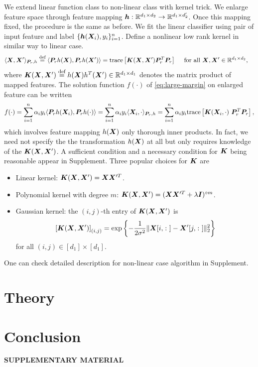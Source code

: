 \documentclass[12pt]{article}
\begin{document}
\label{sec:nonlinear}
We extend linear function class to non-linear class with kernel trick. We enlarge feature space through feature mapping $\bm{h}:\mathbb{R}^{d_1\times d_2}\rightarrow \mathbb{R	}^{d_1\times d_2'}$. Once this mapping fixed, the procedure is the same as before.
We fit the linear classifier using pair of input feature and label $\{\bm{h}(\bm X_i),y_i\}_{i=1}^n$.
Define a nonlinear low rank kernel in similar way to linear case.
\begin{align}\label{eq:nonlinear kernel}
\langle \bm X,\bm X'\rangle_{\bm{P}_r,h} &\stackrel{\text{def}}{=} \langle \bm{P}_r h(\bm X),\bm{P}_r h(\bm X')\rangle = \text{trace}\left[\bm K(\bm X,\bm X')\bm{P}_r^T\bm{P}_r\right]\quad\text{ for all } \bm X,\bm X'\in\mathbb{R}^{d_1\times d_2},
\end{align}
where $\bm K(\bm X,\bm X')\stackrel{\text{def}}{=} h(\bm X)h^T(\bm X')
\in \mathbb{R}^{d_1\times d_1}$ denotes the matrix product of mapped features.
The solution function $ f(\cdot)$ of \eqref{eq:large-margin} on enlarged feature can be written 
\begin{align}
f(\cdot) = \sum_{i=1}^n\alpha _i y_i \langle \bm{P}_r h(\bm X_i), \bm{P}_r h(\cdot)\rangle =  \sum_{i=1}^n  \alpha _i y_i \langle \bm X_i, \cdot\rangle_{ \bm{P}_r,h}  =  \sum_{i=1}^n  \alpha _i y_i \text{trace}\left[\bm K(\bm X_i,\cdot)\ \bm{P}_r^T \bm{P}_r\right],
\end{align}
which involves feature mapping $h(\bm X)$ only thorough inner products. In fact, we need not specify the the transformation $h(\bm X)$ at all but only requires knowledge of the $
\bm K(\bm X,\bm X')$. A sufficient condition and a necessary condition for $\bm K$ being reasonable appear in Supplement.
Three popular choices for $\bm K$ are
\begin{itemize}
\item Linear kernel: $\bm K(\bm X,\bm X')=\bm X\bm X'^T$.
\item Polynomial kernel with degree $m$: $\bm K(\bm X,\bm X')=(\bm X\bm X'^T+\lambda\bm I)^{\circ m}$.
\item Gaussian kernel: the $(i,j)$-th entry of $\bm K(\bm X,\bm X')$ is 
\[
\left[\bm K(\bm X,\bm X')\right]_{(i,j)}=\exp\left\{-{1\over 2\sigma^2} \|\bm X[i,\colon]-\bm X'[j,\colon]\|_2^2\right\}
\]
for all $(i,j)\in[d_1]\times[d_1]$.
\end{itemize}
One can check detailed description for non-linear case algorithm in Supplement.
\section{Theory}
\label{sec:thm}
\section{Conclusion}
\label{sec:conc}


\bigskip
\begin{center}
{\large\bf SUPPLEMENTARY MATERIAL}
\end{center}




\end{document}
